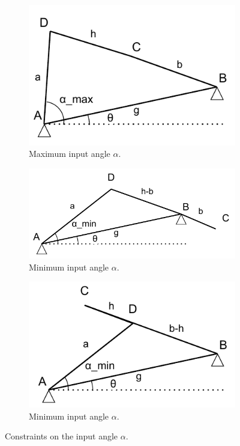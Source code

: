 \documentclass{article}
\begin{document}
 \begin{figure}[h]
 	\centering
 	\begin{subfigure}{0.3\textwidth}
 		\centering
 		\includegraphics[width=\linewidth]{./figures/linkage_input_angle_limits_1.pdf}
 		\caption{Maximum input angle $\alpha$.}
 		\label{fig:max_alpha}
 	\end{subfigure}
 	\hfill
 	\begin{subfigure}{0.3\textwidth}
 		\centering
 		\includegraphics[width=\linewidth]{./figures/linkage_input_angle_limits_2.pdf}
 		\caption{Minimum input angle $\alpha$.}
 		\label{fig::min_alpha-1}
 	\end{subfigure}
 	\hfill
 	\begin{subfigure}{0.3\textwidth}
 	\centering
 	\includegraphics[width=\linewidth]{./figures/linkage_input_angle_limits_3.pdf}
 	\caption{Minimum input angle $\alpha$.}
 	\label{fig::min_alpha-2}
 	\end{subfigure}
 	\caption{Constraints on the input angle $\alpha$.}
 \end{figure}
 
\end{document}
